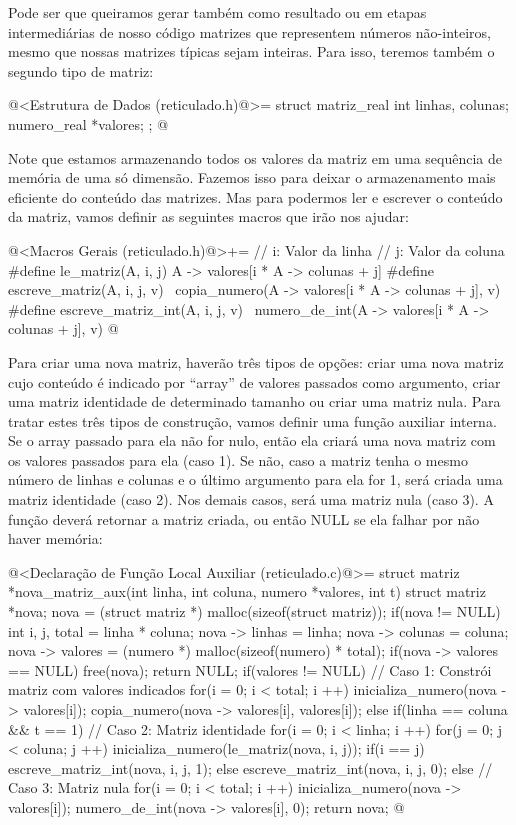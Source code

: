 Pode ser que queiramos gerar também como resultado ou em etapas
intermediárias de nosso código matrizes que representem números
não-inteiros, mesmo que nossas matrizes típicas sejam inteiras. Para
isso, teremos também o segundo tipo de matriz:

\iniciocodigo
@<Estrutura de Dados (reticulado.h)@>=
struct matriz_real{
  int linhas, colunas;
  numero_real *valores;
};
@
\fimcodigo


Note que estamos armazenando todos os valores da matriz em uma
sequência de memória de uma só dimensão. Fazemos isso para deixar o
armazenamento mais eficiente do conteúdo das matrizes. Mas para
podermos ler e escrever o conteúdo da matriz, vamos definir as
seguintes macros que irão nos ajudar:

\iniciocodigo
@<Macros Gerais (reticulado.h)@>+=
// i: Valor da linha     // j: Valor da coluna
#define le_matriz(A, i, j) A -> valores[i * A -> colunas + j]
#define escreve_matriz(A, i, j, v)                    \
        copia_numero(A -> valores[i * A -> colunas + j], v)
#define escreve_matriz_int(A, i, j, v)                \
        numero_de_int(A -> valores[i * A -> colunas + j], v)
@
\fimcodigo

Para criar uma nova matriz, haverão três tipos de opções: criar uma
nova matriz cujo conteúdo é indicado por ``array'' de valores passados
como argumento, criar uma matriz identidade de determinado tamanho ou
criar uma matriz nula. Para tratar estes três tipos de construção,
vamos definir uma função auxiliar interna. Se o array passado para ela
não for nulo, então ela criará uma nova matriz com os valores passados
para ela (caso 1). Se não, caso a matriz tenha o mesmo número de
linhas e colunas e o último argumento para ela for 1, será criada uma
matriz identidade (caso 2). Nos demais casos, será uma matriz nula
(caso 3). A função deverá retornar a matriz criada, ou então NULL se
ela falhar por não haver memória:

\iniciocodigo
@<Declaração de Função Local Auxiliar (reticulado.c)@>=
struct matriz *nova_matriz_aux(int linha, int coluna, numero *valores,
                               int t){
  struct matriz *nova;
  nova = (struct matriz *) malloc(sizeof(struct matriz));
  if(nova != NULL){
    int i, j, total = linha * coluna;
    nova -> linhas = linha;
    nova -> colunas = coluna;
    nova -> valores = (numero *) malloc(sizeof(numero) * total);
    if(nova -> valores == NULL){
      free(nova);
      return NULL;
    }
    if(valores != NULL){ // Caso 1: Constrói matriz com valores indicados
      for(i = 0; i < total; i ++){
        inicializa_numero(nova -> valores[i]);
        copia_numero(nova -> valores[i], valores[i]);
      }
    }
    else if(linha == coluna && t == 1){ // Caso 2: Matriz identidade
      for(i = 0; i < linha; i ++)
        for(j = 0; j < coluna; j ++){
          inicializa_numero(le_matriz(nova, i, j));
          if(i == j){
            escreve_matriz_int(nova, i, j, 1);
          }
          else{
            escreve_matriz_int(nova, i, j, 0);
          }
        }
    }
    else{ // Caso 3: Matriz nula
      for(i = 0; i < total; i ++){
        inicializa_numero(nova -> valores[i]);
        numero_de_int(nova -> valores[i], 0);
      }
    }
  }
  return nova;
}
@
\fimcodigo

